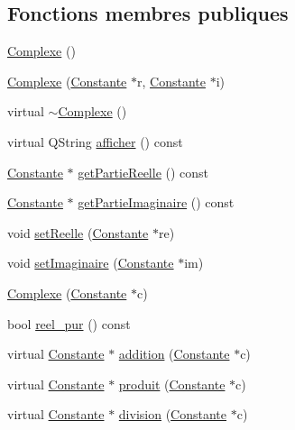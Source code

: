 \subsection*{\-Fonctions membres publiques}
\begin{DoxyCompactItemize}
\item 
\hyperlink{class_complexe_af2cec56db6fdf59ed5ec761ffd4e1608}{\-Complexe} ()
\item 
\hyperlink{class_complexe_ae19286bc2c8f360e3fbc0d65526564d3}{\-Complexe} (\hyperlink{class_constante}{\-Constante} $\ast$r, \hyperlink{class_constante}{\-Constante} $\ast$i)
\item 
virtual \hyperlink{class_complexe_ac92996231047d39d40e11384bb9311b6}{$\sim$\-Complexe} ()
\item 
virtual \-Q\-String \hyperlink{class_complexe_a5141b5b092f78c06f60013e911ba4440}{afficher} () const 
\item 
\hyperlink{class_constante}{\-Constante} $\ast$ \hyperlink{class_complexe_a4441d56fc9776ce78efd8b5d95d9170b}{get\-Partie\-Reelle} () const 
\item 
\hyperlink{class_constante}{\-Constante} $\ast$ \hyperlink{class_complexe_a9e3e38b5362dd83812da9235594d1fcc}{get\-Partie\-Imaginaire} () const 
\item 
void \hyperlink{class_complexe_a7e57ea7cf760e132c80a148e2c344cce}{set\-Reelle} (\hyperlink{class_constante}{\-Constante} $\ast$re)
\item 
void \hyperlink{class_complexe_a2335ce4c53e2b11d4fa4bcbef45415ba}{set\-Imaginaire} (\hyperlink{class_constante}{\-Constante} $\ast$im)
\item 
\hyperlink{class_complexe_ac00d0b5ba1dea7d67c43d257e48fd7b5}{\-Complexe} (\hyperlink{class_constante}{\-Constante} $\ast$c)
\item 
bool \hyperlink{class_complexe_a64fbf7a898e40d86cc0fb2be00c4bddf}{reel\-\_\-pur} () const 
\item 
virtual \hyperlink{class_constante}{\-Constante} $\ast$ \hyperlink{class_complexe_adb3491a51a6b76d8e2c41ab87e519003}{addition} (\hyperlink{class_constante}{\-Constante} $\ast$c)
\item 
virtual \hyperlink{class_constante}{\-Constante} $\ast$ \hyperlink{class_complexe_a921d9d4a3efcf108cb437b265cd65c10}{produit} (\hyperlink{class_constante}{\-Constante} $\ast$c)
\item 
virtual \hyperlink{class_constante}{\-Constante} $\ast$ \hyperlink{class_complexe_a1a2f7b85999d542ebff0a9c0d082c1c8}{division} (\hyperlink{class_constante}{\-Constante} $\ast$c)

\end{DoxyCompactItemize}
